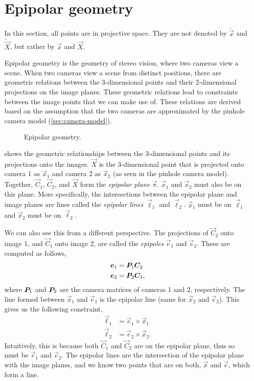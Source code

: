 \section{Epipolar geometry}

\begin{remark}
  In this section, all points are in projective space. They are not denoted by
  $\tilde{\vec{x}}$ and $\tilde{\vec{X}}$, but rather by $\vec{x}$ and
  $\vec{X}$.
\end{remark}

Epipolar geometry is the geometry of stereo vision, where two cameras view a
scene. When two cameras view a scene from distinct positions, there are
geometric relations between the 3-dimensional points and their 2-dimensional
projections on the image planes. These geometric relations lead to constraints
between the image points that we can make use of. These relations are derived
based on the assumption that the two cameras are approximated by the pinhole
camera model (\cref{sec:camera-model}).

\begin{figure}[h!]
    \centering
    \caption{Epipolar geometry.}
    \label{fig:epipolar-geometry}
\end{figure}

 shows the geometric relationships between the
3-dimensional points and its projections onto the images. $\vec{X}$ is the
3-dimensional point that is projected onto camera 1 as $\vec{x}_1$ and camera 2
as $\vec{x}_2$ (as seen in the pinhole camera model). Together, $\vec{C}_1$,
$\vec{C}_2$, and $\vec{X}$ form the \textit{epipolar plane} $\vec{\pi}$.
$\vec{x}_1$ and $\vec{x}_2$ must also be on this plane. More specifically, the
intersections between the epipolar plane and image planes are lines called the
\textit{epipolar lines} $\vec{\ell}_1$ and $\vec{\ell}_2$. $\vec{x}_1$ must be
on $\vec{\ell}_1$ and $\vec{x}_2$ must be on $\vec{\ell}_2$. 

We can also see this from a different perspective. The projections of
$\vec{C}_2$ onto image 1, and $\vec{C}_1$ onto image 2, are called the
\textit{epipoles} $\vec{e}_1$ and $\vec{e}_2$. These are computed as follows,
\begin{align*}
  \bm{e}_1 &= \bm{P}_1 \bm{C}_2 \\
  \bm{e}_2 &= \bm{P}_2 \bm{C}_1
,\end{align*}
where $\bm{P}_1$ and $\bm{P}_2$ are the camera matrices of cameras 1 and 2,
respectively. The line formed between $\vec{x}_1$ and $\vec{e}_1$ is the
epipolar line (same for $\vec{x}_2$ and $\vec{e}_2$). This gives us the
following constraint,
\begin{align*}
  \vec{\ell}_1 &= \vec{e}_1 \times \vec{x}_1 \\
  \vec{\ell}_2 &= \vec{e}_2 \times \vec{x}_2
.\end{align*}
Intuitively, this is because both $\vec{C}_1$ and $\vec{C}_2$ are on the
epipolar plane, thus so must be $\vec{e}_1$ and $\vec{e}_2$. The epipolar lines
are the intersection of the epipolar plane with the image planes, and we know
two points that are on both, $\vec{x}$ and $\vec{e}$, which form a line.

